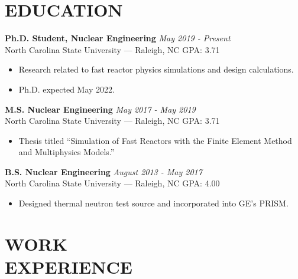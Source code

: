\documentclass[margin, 10pt]{res}
\newcommand{\backwardspace}{-8pt}
\begin{document}
\begin{resume}


\vspace{-12pt}
 
\section{EDUCATION}  
\textbf{Ph.D. Student, Nuclear Engineering} \hfill 
  \textit{May 2019 - Present}\\
North Carolina State University --- Raleigh, NC \hfill GPA: 3.71
\begin{itemize}
    \item Research related to fast reactor physics simulations and design calculations.
    \item Ph.D. expected May 2022.
\end{itemize}
\vspace{\backwardspace}
\textbf{M.S. Nuclear Engineering} \hfill \textit{May 2017 - May 2019} \\
North Carolina State University --- Raleigh, NC \hfill GPA: 3.71
\begin{itemize}
  \item Thesis titled ``Simulation of Fast Reactors with the Finite Element Method and Multiphysics Models.''
\end{itemize}
\vspace{\backwardspace}
\textbf{B.S. Nuclear Engineering} \hfill \textit{August 2013 - May 2017} \\
North Carolina State University --- Raleigh, NC \hfill GPA: 4.00
\begin{itemize}
    \item Designed thermal neutron test source and incorporated into GE's PRISM.
\end{itemize}

 
\vspace{-0.125in}
\section{WORK \\ EXPERIENCE}


\end{resume}
\end{document}
